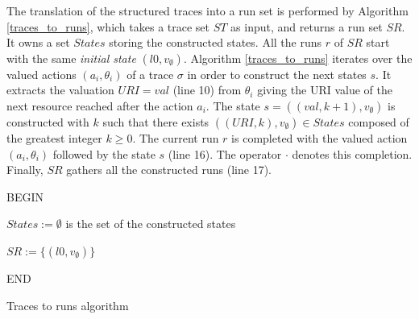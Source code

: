 The translation of the structured traces into a run set is
performed by Algorithm \ref{traces_to_runs}, which takes a
trace set $ST$ as input, and returns a run set $SR$. It owns a
set $States$ storing the constructed states. All the runs $r$ of
$SR$ start with the same \emph{initial state} $(l0,v_\emptyset)$.
Algorithm \ref{traces_to_runs} iterates over the valued actions
$(a_i,\theta_i)$ of a trace $\sigma$ in order to construct the
next states $s$. It extracts the valuation $URI=val$ (line 10) from
$\theta_i$ giving the URI value of the next resource reached
after the action $a_i$. The state $s=((val,k+1),v_\emptyset)$ is
constructed with $k$ such that there exists
$((URI,k),v_\emptyset) \in States$ composed of the greatest
integer $k \geq 0$. The current run $r$ is completed with the
valued action $(a_i,\theta_i)$ followed by the state $s$ (line
16). The operator $\cdot$ denotes this completion. Finally, $SR$
gathers all the constructed runs (line 17).

\begin{algorithm}
 


BEGIN\;

$States:=\emptyset$ is the set of the constructed states\;

 {
$SR:= \{(l0,v_\emptyset)\}$}

END\;

    \caption{Traces to runs algorithm}
    \label{traces_to_runs}
\end{algorithm}

